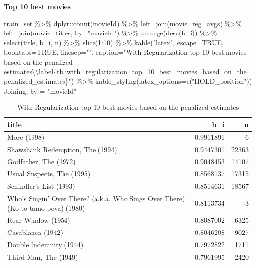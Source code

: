 \documentclass[
]{article}
\newenvironment{Shaded}{}{}
\newcommand{\AttributeTok}[1]{\textcolor[rgb]{0.49,0.56,0.16}{#1}}
\newcommand{\ConstantTok}[1]{\textcolor[rgb]{0.53,0.00,0.00}{#1}}
\newcommand{\DecValTok}[1]{\textcolor[rgb]{0.25,0.63,0.44}{#1}}
\newcommand{\FunctionTok}[1]{\textcolor[rgb]{0.02,0.16,0.49}{#1}}
\newcommand{\NormalTok}[1]{#1}
\newcommand{\OtherTok}[1]{\textcolor[rgb]{0.00,0.44,0.13}{#1}}
\newcommand{\SpecialCharTok}[1]{\textcolor[rgb]{0.25,0.44,0.63}{#1}}
\newcommand{\StringTok}[1]{\textcolor[rgb]{0.25,0.44,0.63}{#1}}
\begin{document}
\textbf{Top 10 best movies}

\begin{Shaded}
\begin{Highlighting}[]
\NormalTok{train\_set }\SpecialCharTok{\%\textgreater{}\%}
\NormalTok{  dplyr}\SpecialCharTok{::}\FunctionTok{count}\NormalTok{(movieId) }\SpecialCharTok{\%\textgreater{}\%} 
  \FunctionTok{left\_join}\NormalTok{(movie\_reg\_avgs) }\SpecialCharTok{\%\textgreater{}\%}
  \FunctionTok{left\_join}\NormalTok{(movie\_titles, }\AttributeTok{by=}\StringTok{"movieId"}\NormalTok{) }\SpecialCharTok{\%\textgreater{}\%}
  \FunctionTok{arrange}\NormalTok{(}\FunctionTok{desc}\NormalTok{(b\_i)) }\SpecialCharTok{\%\textgreater{}\%} 
  \FunctionTok{select}\NormalTok{(title, b\_i, n) }\SpecialCharTok{\%\textgreater{}\%} 
  \FunctionTok{slice}\NormalTok{(}\DecValTok{1}\SpecialCharTok{:}\DecValTok{10}\NormalTok{) }\SpecialCharTok{\%\textgreater{}\%} 
  \FunctionTok{kable}\NormalTok{(}\StringTok{"latex"}\NormalTok{, }\AttributeTok{escape=}\ConstantTok{TRUE}\NormalTok{, }\AttributeTok{booktabs=}\ConstantTok{TRUE}\NormalTok{, }\AttributeTok{linesep=}\StringTok{""}\NormalTok{, }\AttributeTok{caption=}\StringTok{"With Regularization top 10 best movies based on the penalized estimates}\SpecialCharTok{\textbackslash{}\textbackslash{}}\StringTok{label\{tbl:with\_regularization\_top\_10\_best\_movies\_based\_on\_the\_penalized\_estimates\}"}\NormalTok{) }\SpecialCharTok{\%\textgreater{}\%} \FunctionTok{kable\_styling}\NormalTok{(}\AttributeTok{latex\_options=}\FunctionTok{c}\NormalTok{(}\StringTok{"HOLD\_position"}\NormalTok{))}
\NormalTok{Joining, by }\OtherTok{=} \StringTok{"movieId"}
\end{Highlighting}
\end{Shaded}

\begin{table}[H]

\caption{\label{tab:e_u_pls_1}With Regularization top 10 best movies based on the penalized estimates\label{tbl:with_regularization_top_10_best_movies_based_on_the_penalized_estimates}}
\centering
\begin{tabular}[t]{lrr}
\toprule
title & b\_i & n\\
\midrule
More (1998) & 0.9911891 & 6\\
Shawshank Redemption, The (1994) & 0.9447301 & 22363\\
Godfather, The (1972) & 0.9048453 & 14107\\
Usual Suspects, The (1995) & 0.8568137 & 17315\\
Schindler's List (1993) & 0.8514631 & 18567\\
Who's Singin' Over There? (a.k.a. Who Sings Over There) (Ko to tamo peva) (1980) & 0.8113734 & 3\\
Rear Window (1954) & 0.8087002 & 6325\\
Casablanca (1942) & 0.8046208 & 9027\\
Double Indemnity (1944) & 0.7972822 & 1711\\
Third Man, The (1949) & 0.7961995 & 2420\\
\bottomrule
\end{tabular}
\end{table}
\end{document}
